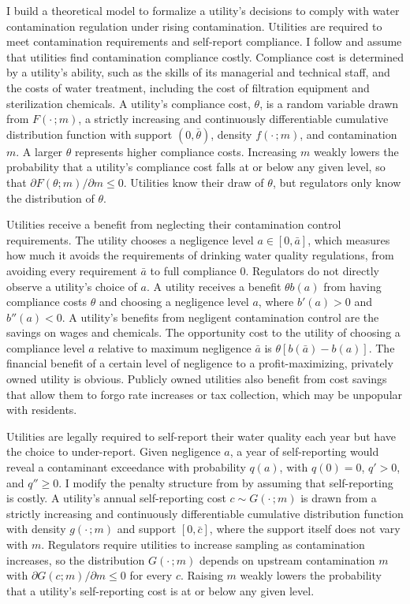 \documentclass[12pt]{article}
\begin{document}
	I build a theoretical model to formalize a utility's decisions to comply with water contamination regulation under rising contamination. Utilities are required to meet contamination requirements and self-report compliance. I follow \textcite{mookherjee1994marginal} and assume that utilities find contamination compliance costly. Compliance cost is determined by a utility's ability, such as the skills of its managerial and technical staff, and the costs of water treatment, including the cost of filtration equipment and sterilization chemicals. A utility's compliance cost, $\theta$, is a random variable drawn from $F(\cdot\,;m)$, a strictly increasing and continuously differentiable cumulative distribution function with support $(0, \bar{\theta})$, density $f(\cdot\,;m)$, and contamination $m$. A larger $\theta$ represents higher compliance costs. Increasing $m$ weakly lowers the probability that a utility's compliance cost falls at or below any given level, so that $\partial F(\theta;m)/\partial m \le 0$. Utilities know their draw of $\theta$, but regulators only know the distribution of $\theta$. 

    Utilities receive a benefit from neglecting their contamination control requirements. The utility chooses a negligence level $a \in [0, \bar{a}]$, which measures how much it avoids the requirements of drinking water quality regulations, from avoiding every requirement $\bar{a}$ to full compliance 0. Regulators do not directly observe a utility's choice of $a$. A utility receives a benefit $\theta b(a)$ from having compliance costs $\theta$ and choosing a negligence level $a$, where $b'(a)>0$ and $b''(a)<0$. A utility's benefits from negligent contamination control are the savings on wages and chemicals. The opportunity cost to the utility of choosing a compliance level $a$ relative to maximum negligence $\bar{a}$ is $\theta[b(\bar{a})-b(a)]$. The financial benefit of a certain level of negligence to a profit-maximizing, privately owned utility is obvious. Publicly owned utilities also benefit from cost savings that allow them to forgo rate increases or tax collection, which may be unpopular with residents.
	
	Utilities are legally required to self-report their water quality each year but have the choice to under-report. Given negligence $a$, a year of self-reporting would reveal a contaminant exceedance with probability $q(a)$, with $q(0)=0$, $q'>0$, and $q'' \ge 0$. I modify the penalty structure from \textcite{kaplow1994optimal} by assuming that self-reporting is costly. A utility's annual self-reporting cost $c \sim G(\cdot\,;m)$ is drawn from a strictly increasing and continuously differentiable cumulative distribution function with density $g(\cdot\,;m)$ and support $[0,\bar{c}]$, where the support itself does not vary with $m$. Regulators require utilities to increase sampling as contamination increases, so the distribution $G(\cdot\,;m)$ depends on upstream contamination $m$ with $\partial G(c;m)/\partial m \le 0$ for every $c$. Raising $m$ weakly lowers the probability that a utility's self-reporting cost is at or below any given level. 
	
\end{document}
